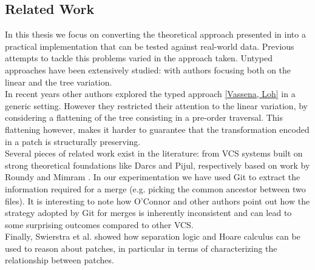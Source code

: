 \documentclass[11pt, titlepage]{article}
\begin{document}
\subsection{Related Work}\label{rel-work}
In this thesis we focus on converting the theoretical approach presented in \cite{type-directed-diff} into a practical implementation that can be tested against real-world data. Previous attempts to tackle this problems varied in the approach taken. 
Untyped approaches have been extensively studied: with authors focusing both on the linear \cite{diff, bergroth} and the tree \cite{Akutsu, klein,demanie, billie, autexier, chawalthe} variation. 
\\
In recent years other authors explored the typed approach \ref{Vassena, Loh} in a generic setting. However they restricted their attention to the linear variation, by considering a flattening of the tree consisting in a pre-order traversal. This flattening however, makes it harder to guarantee that the transformation encoded in a patch is structurally preserving.
\\
Several pieces of related work exist in the literature: from VCS systems built on strong theoretical foundations like Darcs and Pijul, respectively based on work by Roundy \cite{darcs} and Mimram \cite{cat-of-patches}. In our experimentation we have used Git to extract the information required for a merge (e.g. picking the common ancestor between two files). It is interesting to note how O'Connor \cite{git-inconsitent} and other authors point out how the strategy adopted by Git for merges is inherently inconsistent and can lead to some surprising outcomes compared to other VCS.
\\
Finally, Swierstra et al. \cite{swie-loh} showed how separation logic and Hoare calculus can be used to reason about patches, in particular in terms of characterizing the relationship between patches.
%
\end{document}
